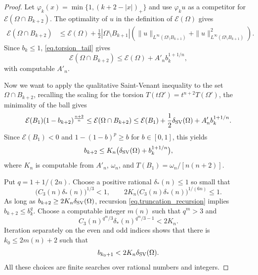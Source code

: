 \documentclass[11pt]{amsart}
\theoremstyle{plain}
\theoremstyle{definition}
\begin{document}
\begin{proof}
Let $\varphi_k(x)=\min\{1,(k+2-|x|)_+\}$ and use $\varphi_ku$ as a competitor for $\mathcal{E}(\Omega\cap B_{k+2})$. The optimality of $u$ in the definition of $\mathcal{E}(\Omega)$ gives
\begin{align*}
 \mathcal{E}(\Omega\cap B_{k+2})
 &\le\mathcal{E}(\Omega)
 +\frac{1}{2}|\Omega\setminus B_{k+1}|
 \left(\|u\|_{L^\infty(\Omega\setminus B_{k+1})}
 +\|u\|_{L^\infty(\Omega\setminus B_{k+1})}^2\right).
\end{align*}
 Since $b_k\le1$, \eqref{eq.torsion_tail} gives
\begin{equation}\label{eq.truncation_energy}
 \mathcal{E}(\Omega\cap B_{k+2})
 \le\mathcal{E}(\Omega)+A'_n b_k^{1+1/n},
\end{equation}
with computable $A'_n$. 

Now we want to apply the qualitative Saint-Venant inequality to the set $\Omega\cap B_{k+2}$, recalling the scaling for the torsion $T(t \Omega') = t^{n+2}T(\Omega')$, the minimality of the ball gives
\[
 \mathcal{E}(B_1)(1-b_{k+2})^{\frac{n+2}{n}}
 \le\mathcal{E}(\Omega\cap B_{k+2})
 \le\mathcal{E}(B_1)+\frac{1}{2}\delta_{\rm SV}(\Omega)+A'_n b_k^{1+1/n}.
\]
Since $\mathcal{E}(B_1)<0$ and $1-(1-b)^p\ge b$ for $b\in[0,1]$, this yields
\begin{equation}\label{eq.truncation_recursion}
 b_{k+2}\le K_n\bigl(\delta_{\rm SV}(\Omega)+b_k^{1+1/n}\bigr),
\end{equation}
where $K_n$ is computable from $A'_n$, $\omega_n$, and
$T(B_1)=\omega_n/[n(n+2)]$.


Put $q=1+1/(2n)$. Choose a positive rational $\delta_*(n)\le1$ so small that
\[
 \bigl(C_3(n)\delta_*(n)\bigr)^{1/3}<1,
 \qquad
 2K_n\bigl(C_3(n)\delta_*(n)\bigr)^{1/(6n)}\le1.
\]
As long as $b_{k+2}\ge2K_n\delta_{\rm SV}(\Omega)$, recursion
\eqref{eq.truncation_recursion} implies $b_{k+2}\le b_k^q$. Choose a
computable integer $m(n)$ such that $q^m>3$  and
  \[
 C_3(n)^{q^{m}/3}\delta_*(n)^{q^{m}/3-1}<2K_n.
\]
Iteration separately on the even and odd indices shows that there is
$k_0\le2m(n)+2$ such that
\begin{equation}\label{eq.truncation_tail_mass}
 b_{k_0+1}<2K_n\delta_{\rm SV}(\Omega).
\end{equation}
All these choices are finite searches over rational numbers and integers.



\end{proof}
\end{document}
